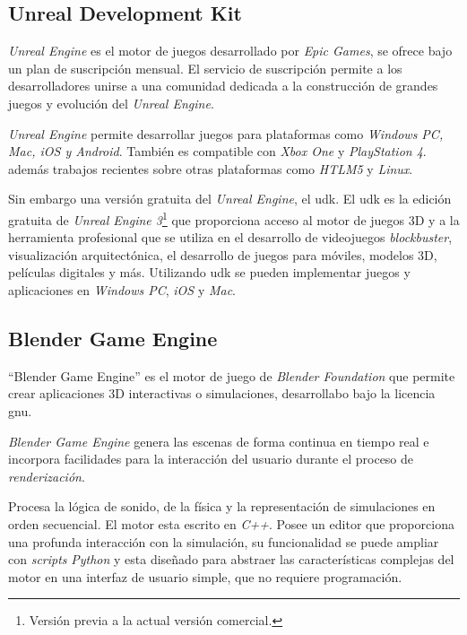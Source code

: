 \subsection{Unreal Development Kit}

\textit{Unreal Engine} es el motor de juegos desarrollado por \textit{Epic
    Games}, se ofrece bajo un plan de suscripción mensual. El servicio de
suscripción permite a los desarrolladores unirse a una comunidad dedicada a la
construcción de grandes juegos y evolución del \textit{Unreal
    Engine}\cite{unrealengine}.

\textit{Unreal Engine} permite desarrollar juegos para plataformas como
\textit{Windows PC, Mac, iOS y Android}. También es compatible con \textit{Xbox
    One} y \textit{PlayStation 4}.  además trabajos recientes
sobre otras plataformas como \textit{HTLM5} y \textit{Linux}\cite{unrealengine}.

Sin embargo  una versión gratuita del \textit{Unreal Engine}, el
\Gls{udk}. El \Gls{udk} es la edición gratuita de \textit{Unreal Engine
    3}\footnote{Versión previa a la actual versión comercial.} que proporciona
acceso al motor de juegos 3D y a la herramienta profesional que se utiliza en el
desarrollo de videojuegos \textit{blockbuster}, visualización arquitectónica, el
desarrollo de juegos para móviles, modelos 3D, películas digitales y más.
Utilizando \Gls{udk} se pueden implementar juegos y aplicaciones en
\textit{Windows PC}, \textit{iOS} y \textit{Mac}.


\subsection{Blender Game Engine}


\enquote{Blender Game Engine} es el motor de juego de \textit{Blender
    Foundation} que permite crear aplicaciones 3D interactivas o simulaciones,
desarrollabo bajo la licencia \Gls{gnu}\cite{blender}.

\textit{Blender Game Engine} genera las escenas de forma continua en tiempo real
e incorpora facilidades para la interacción del usuario durante el proceso de
\textit{renderización}\cite{blender}.

Procesa la lógica de sonido, de la física y la representación de simulaciones en
orden secuencial. El motor esta escrito en \textit{C++}. Posee un editor que
proporciona una profunda interacción con la simulación, su funcionalidad se
puede ampliar con \textit{scripts} \textit{Python} y esta diseñado para abstraer
las características complejas del motor en una interfaz de usuario simple, que
no requiere programación\cite{blender}.


